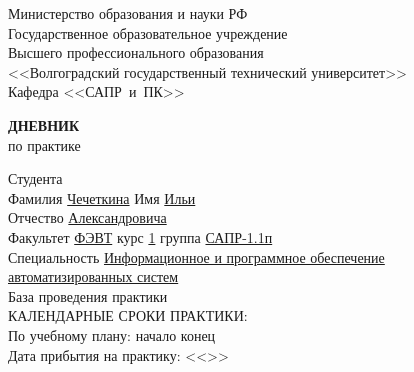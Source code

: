 \begin{titlepage}
    \begin{center}
        Министерство образования и науки РФ \\
        Государственное образовательное учреждение\\
        Высшего профессионального образования\\
        <<Волгоградский государственный технический университет>>\\
        Кафедра <<САПР~и~ПК>>
    \end{center}
    \vspace{0.5cm}
    \begin{center}
        \large \textbf{ДНЕВНИК} \\
        по практике
    \end{center}
    \begin{flushleft}
        Студента\\
        Фамилия \underline{Чечеткина\hspace{2.6cm}}
        Имя \underline{Ильи\hspace{3.5cm}}\\
        Отчество \underline{Александровича\hspace{1.33cm}}\\
        Факультет \underline{ФЭВТ\hspace{3.23cm}} курс \underline{1\hspace{.8cm}}
        группа \underline{САПР-1.1п\hspace{2.2cm}}\\
        \vspace{1cm}
        Специальность \underline{Информационное и программное обеспечение\hspace{3.35cm}}\\
        \underline{автоматизированных систем\hspace{10.65cm}}\\
        База проведения практики \underline{\hspace{10.8cm}}\\
        \vspace{1cm}
        КАЛЕНДАРНЫЕ СРОКИ ПРАКТИКИ:\\
        По учебному плану: \hspace{0.2cm} начало \underline{\hspace{4.3cm}}
        конец \underline{\hspace{4.3cm}}\\
        Дата прибытия на практику: <<\underline{\hspace{1cm}}>> \underline{\hspace{3cm}}

\end{flushleft}
\end{titlepage}
